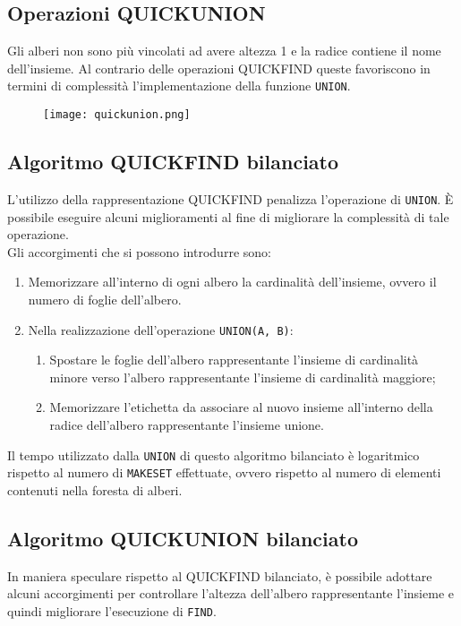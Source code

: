 \subsection{Operazioni QUICKUNION}
Gli alberi non sono più vincolati ad avere altezza 1 e la radice contiene il nome dell'insieme.
Al contrario delle operazioni QUICKFIND queste favoriscono in termini di 
complessità l'implementazione della funzione \texttt{UNION}.
\begin{figure}[h]
    \texttt{[image: quickunion.png]}
\end{figure}

\subsection{Algoritmo QUICKFIND bilanciato}
L'utilizzo della rappresentazione QUICKFIND penalizza l'operazione di \texttt{UNION}.
È possibile eseguire alcuni miglioramenti al fine di migliorare la complessità di tale operazione.\\
Gli accorgimenti che si possono introdurre sono:
\begin{enumerate}
    \item Memorizzare all'interno di ogni albero la cardinalità dell'insieme, ovvero
    il numero di foglie dell'albero.
    \item Nella realizzazione dell'operazione \texttt{UNION(A, B)}:
    \begin{enumerate}
        \item Spostare le foglie dell'albero rappresentante l'insieme di cardinalità 
        minore verso l'albero rappresentante l'insieme di cardinalità maggiore;
        \item Memorizzare l'etichetta da associare al nuovo insieme all'interno della radice
        dell'albero rappresentante l'insieme unione.

    \end{enumerate}
\end{enumerate}

Il tempo utilizzato dalla \texttt{UNION} di questo algoritmo bilanciato è logaritmico
rispetto al numero di \texttt{MAKESET} effettuate, ovvero rispetto al numero di 
elementi contenuti nella foresta di alberi.

\subsection{Algoritmo QUICKUNION bilanciato}
In maniera speculare rispetto al QUICKFIND bilanciato, è possibile adottare alcuni 
accorgimenti per controllare l'altezza dell'albero rappresentante l'insieme e quindi
migliorare l'esecuzione di \texttt{FIND}.
